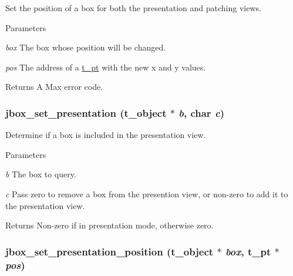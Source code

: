 Set the position of a box for both the presentation and patching views. 
\begin{DoxyParams}{Parameters}
\item[{\em box}]The box whose position will be changed. \item[{\em pos}]The address of a \hyperlink{structt__pt}{t\_\-pt} with the new x and y values. \end{DoxyParams}
\begin{DoxyReturn}{Returns}
A Max error code. 
\end{DoxyReturn}
\hypertarget{group__jbox_ga67bc0679e3f4456a6ac791fa1ebef568}{
\subsubsection[{jbox\_\-set\_\-presentation}]{ jbox\_\-set\_\-presentation ({\bf t\_\-object} $\ast$ {\em b}, \/  char {\em c})}}
\label{group__jbox_ga67bc0679e3f4456a6ac791fa1ebef568}


Determine if a box is included in the presentation view. 
\begin{DoxyParams}{Parameters}
\item[{\em b}]The box to query. \item[{\em c}]Pass zero to remove a box from the presention view, or non-\/zero to add it to the presentation view. \end{DoxyParams}
\begin{DoxyReturn}{Returns}
Non-\/zero if in presentation mode, otherwise zero. 
\end{DoxyReturn}
\hypertarget{group__jbox_gad20f69b425b1a22686cfa909d509af60}{
\subsubsection[{jbox\_\-set\_\-presentation\_\-position}]{ jbox\_\-set\_\-presentation\_\-position ({\bf t\_\-object} $\ast$ {\em box}, \/  {\bf t\_\-pt} $\ast$ {\em pos})}}
\label{group__jbox_gad20f69b425b1a22686cfa909d509af60}


